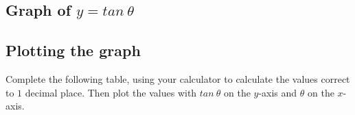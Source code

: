 \subsection{Graph of $y=tan~\theta $ }
\subsection*{Plotting the graph}
\nopagebreak
Complete the following table, using your calculator to calculate the values correct to $1$ decimal place. Then plot the values with $tan~\theta $ on the $y$-axis and $\theta $ on the $x$-axis.\par 

\setlength\mytablespace{16\tabcolsep}
\addtolength\mytablespace{9\arrayrulewidth}
\setlength\mytablewidth{\linewidth}
\setlength\mytableroom{\mytablewidth}
\addtolength\mytableroom{-\mytablespace}
\setlength\myfixedwidth{0pt}
\setlength\mystarwidth{\mytableroom}
\addtolength\mystarwidth{-\myfixedwidth}
\divide{}

